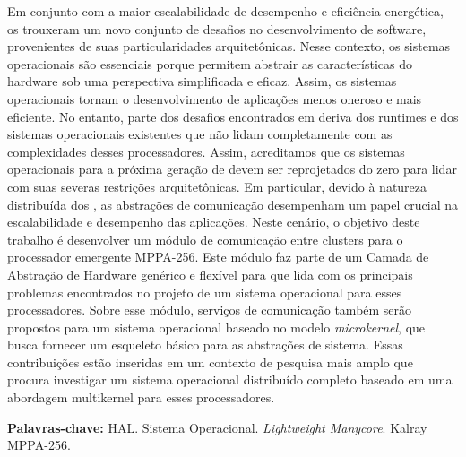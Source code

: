 
\begin{resumo}[Resumo]
	Em conjunto com a maior escalabilidade de desempenho e eficiência energética,
	os \lightweight \manycores trouxeram um novo conjunto de desafios no
	desenvolvimento de software, provenientes de suas particularidades arquitetônicas.
	Nesse contexto, os sistemas operacionais são essenciais porque permitem abstrair
	as características do hardware sob uma perspectiva simplificada e eficaz.
	Assim, os sistemas operacionais tornam o desenvolvimento de aplicações
	menos oneroso e mais eficiente.
	No entanto, parte dos desafios encontrados em \lightweight \manycores
	deriva dos runtimes e dos sistemas operacionais existentes que não lidam
	completamente com as complexidades desses processadores.
	Assim, acreditamos que os sistemas operacionais para a próxima geração de
	\lightweight \manycores devem ser reprojetados do zero para lidar
	com suas severas restrições arquitetônicas.
	Em particular, devido à natureza distribuída dos \manycores, as
	abstrações de comunicação desempenham um papel crucial na escalabilidade
	e desempenho das aplicações.
	Neste cenário, o objetivo deste trabalho é desenvolver um módulo de comunicação
	entre clusters para o processador \manycore emergente MPPA-256.
	Este módulo faz parte de um Camada de Abstração de Hardware genérico e
	flexível para \lightweight \manycores que lida com os principais
	problemas encontrados no projeto de um sistema operacional para esses processadores.
	Sobre esse módulo, serviços de comunicação também serão propostos para
	um sistema operacional baseado no modelo \textit{microkernel}, que busca
	fornecer um esqueleto básico para as abstrações de sistema.
	Essas contribuições estão inseridas em um contexto de pesquisa mais amplo
	que procura investigar um sistema operacional distribuído completo baseado
	em uma abordagem multikernel para esses processadores.

	\vspace{\baselineskip}
	\textbf{Palavras-chave:} HAL. Sistema Operacional. \textit{Lightweight Manycore}. Kalray MPPA-256.
\end{resumo}

